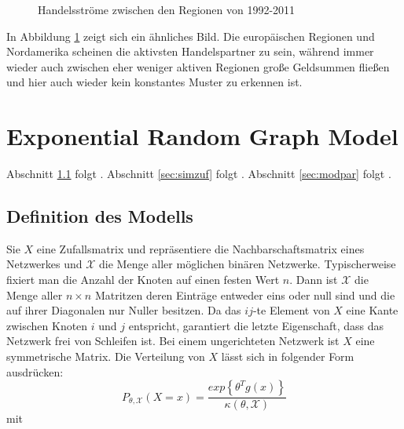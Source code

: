 \documentclass[a4paper,ngerman,oneside,titlepage,bibliography=totoc,11pt]{scrreprt}
\begin{document}
\begin{figure}[ht]
\centering
{}
\caption{Handelsströme zwischen den Regionen von 1992-2011}
\label{fig:reg}
\end{figure}

In Abbildung \ref{fig:reg} zeigt sich ein ähnliches Bild. Die europäischen Regionen und Nordamerika scheinen die aktivsten Handelspartner zu sein, während immer wieder auch zwischen eher weniger aktiven Regionen große Geldsummen fließen und hier auch wieder kein konstantes Muster zu erkennen ist.  

\chapter{Exponential Random Graph Model}
Abschnitt \ref{sec:defmod} folgt \citep{hunter2008ergm}.
Abschnitt \ref{sec:simzuf} folgt \citep[Kapitel 12.2]{lkr12}.
Abschnitt \ref{sec:modpar} folgt \citep[Kapitel 12.3]{lkr12}.

\section{Definition des Modells}
\label{sec:defmod}
Sie $X$ eine Zufallsmatrix und repräsentiere die Nachbarschaftsmatrix eines Netzwerkes und $\mathcal{X}$ die Menge aller möglichen binären Netzwerke. Typischerweise fixiert man die Anzahl der Knoten auf einen festen Wert $n$. Dann ist $\mathcal{X}$ die Menge aller $n \times n$ Matritzen deren Einträge entweder eins oder null sind und die auf ihrer Diagonalen nur Nuller besitzen. Da das $ij$-te Element von $X$ eine Kante zwischen Knoten $i$ und $j$ entspricht, garantiert die letzte Eigenschaft, dass das Netzwerk frei von Schleifen ist. Bei einem ungerichteten Netzwerk ist $X$ eine symmetrische Matrix.
Die Verteilung von $X$ lässt sich in folgender Form ausdrücken:
\begin{equation}
P_{\theta, \mathcal{X}}(X = x) = \frac{exp\left\{\theta^T g(x)\right\}}{\kappa(\theta, \mathcal{X})}
\label{eq:ergm}
\end{equation}
mit
\end{document}
